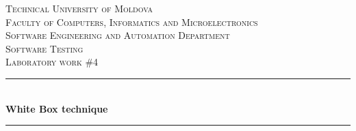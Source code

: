\begin{titlepage}

  \begin{center} %

  \textsc{\large Technical University of Moldova}\\[0.5cm] 
  \textsc{\large Faculty of Computers, Informatics and Microelectronics}\\[0.5cm]
  \textsc{\large Software Engineering and Automation Department}\\[0.5cm]
  \vspace{25 mm}
  \textsc{\Large Software Testing}\\[0.5cm] %
  \textsc{\large Laboratory work \#4}\\[0.5cm] %

  \newcommand{\HRule}{\rule{\linewidth}{0.5mm}} %

  \vspace{10 mm}
  \HRule \\[0.4cm]
  { \LARGE \bfseries White Box technique }\\[0.4cm] %
  \HRule \\[1.5cm]

      \vspace{30mm}


\end{center}
\end{titlepage}
